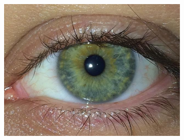 \begin{figure}[H]
\begin{subfigure}{0.25\textwidth}
  \includegraphics[width=\linewidth]{img/Resultados/warsaw/left_65.jpg}
  \caption{}
\end{subfigure}


\end{figure}
